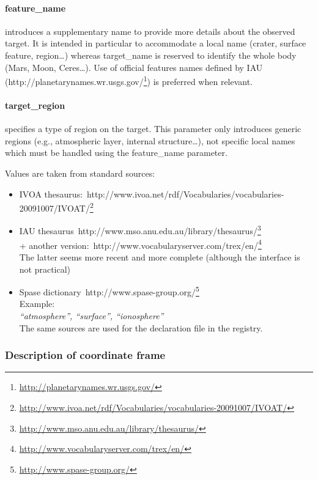 \documentclass[11pt,a4paper]{ivoa}
\begin{document}
\paragraph{feature\_name}

introduces a supplementary name to provide more details about the observed target. It is intended in particular to accommodate a local name (crater, surface feature, region…) whereas target\_name is reserved to identify the whole body (Mars, Moon, Ceres…). Use of official features names defined by IAU (http://planetarynames.wr.usgs.gov/\footnote{\url{http://planetarynames.wr.usgs.gov/}}) is preferred when relevant.

\paragraph{target\_region}

specifies a type of region on the target. This parameter only introduces generic regions  (e.g., atmospheric layer, internal structure…), not specific local names which must be handled using the feature\_name parameter.

Values are taken from standard sources:

\begin{itemize}
\item IVOA thesaurus: http://www.ivoa.net/rdf/Vocabularies/vocabularies-20091007/IVOAT/\footnote{\url{http://www.ivoa.net/rdf/Vocabularies/vocabularies-20091007/IVOAT/}}
\item IAU thesaurus http://www.mso.anu.edu.au/library/thesaurus/\footnote{\url{http://www.mso.anu.edu.au/library/thesaurus/}}\\+ another version: http://www.vocabularyserver.com/trex/en/\footnote{\url{http://www.vocabularyserver.com/trex/en/}}\\The latter seems more recent and more complete (although the interface is not practical)
\item Spase dictionary http://www.spase-group.org/\footnote{\url{http://www.spase-group.org/}}\\Example: \\\emph{``atmosphere'', ``surface'', ``ionosphere''}\\The same sources are used for the declaration file in the registry.
\end{itemize}

\subsubsection{Description of coordinate frame}
\end{document}
